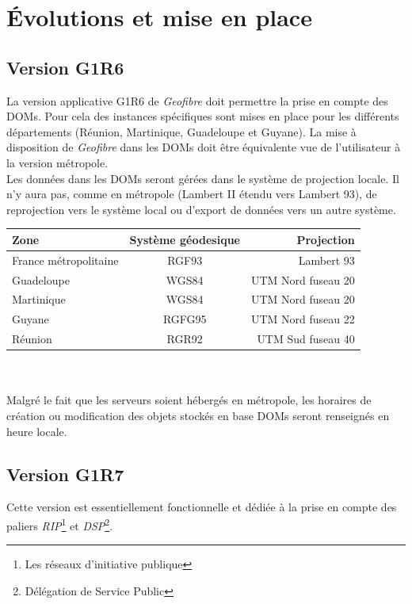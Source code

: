 

\chapter{\'Evolutions et mise en place}
\section{Version G1R6}

La version applicative G1R6 de \textit{Geofibre} doit permettre la prise en compte des DOMs. Pour cela des instances spécifiques sont mises en place  pour les différents départements (Réunion, Martinique, Guadeloupe et Guyane).
La mise à disposition de \textit{Geofibre} dans les DOMs doit être équivalente vue de l’utilisateur à la version métropole.
\\Les données dans les DOMs seront gérées dans le système de projection locale. Il n’y aura pas, comme en métropole (Lambert II étendu vers Lambert 93), de reprojection vers le système local ou d’export de données vers un autre système.\\

\begin{tabular}{|l|c|r|}
  \hline
    Zone & Système géodesique & Projection \\
  \hline
  France métropolitaine & RGF93 & Lambert 93 \\
  Guadeloupe & WGS84 & UTM Nord fuseau 20 \\
  Martinique & WGS84 & UTM Nord fuseau 20 \\
  Guyane & RGFG95 & UTM Nord fuseau 22 \\
  Réunion & RGR92 & UTM Sud fuseau 40 \\
  \hline
\end{tabular}\\\\

Malgré le fait que les serveurs soient hébergés en métropole, les horaires de création ou modification des objets stockés en base DOMs seront renseignés en heure locale.

\section{Version G1R7}
Cette version est essentiellement  fonctionnelle et dédiée à la prise en compte des paliers \textit{RIP}\footnote{Les réseaux d’initiative publique} et \textit{DSP}\footnote{Délégation de Service Public}.

